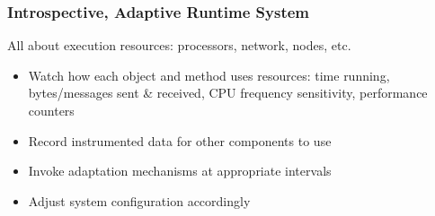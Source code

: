 \begin{frame}
\frametitle{Introspective, Adaptive Runtime System}
All about execution resources: processors, network, nodes, etc.
\begin{itemize}
\item Watch how each object and method uses resources: time running, bytes/messages sent \& received, CPU frequency sensitivity, performance counters
\item Record instrumented data for other components to use
\item Invoke adaptation mechanisms at appropriate intervals
\item Adjust system configuration accordingly
\end{itemize}
\end{frame}
